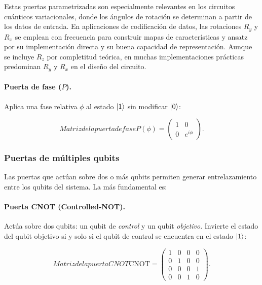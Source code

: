 Estas puertas parametrizadas son especialmente relevantes en los circuitos cuánticos variacionales, donde los ángulos de rotación se determinan a partir de los datos de entrada. En aplicaciones de codificación de datos, las rotaciones $R_y$ y $R_x$ se emplean con frecuencia para construir mapas de características y ansatz por su implementación directa y su buena capacidad de representación. Aunque se incluye $R_z$ por completitud teórica, en muchas implementaciones prácticas predominan $R_y$ y $R_x$ en el diseño del circuito.

\paragraph{Puerta de fase ($P$).} Aplica una fase relativa $\phi$ al estado $\ket{1}$ sin modificar $\ket{0}$:

\begin{equation}{Matriz de la puerta de fase}
P(\phi) = \begin{pmatrix} 1 & 0 \\ 0 & e^{i\phi} \end{pmatrix}.
\end{equation}

\subsubsection{Puertas de múltiples qubits}
\label{ap:subsubsec:puertasmultiplesqubits}

Las puertas que actúan sobre dos o más qubits permiten generar entrelazamiento entre los qubits del sistema. La más fundamental es:

\paragraph{Puerta CNOT (Controlled-NOT).} Actúa sobre dos qubits: un qubit de \textit{control} y un qubit \textit{objetivo}. Invierte el estado del qubit objetivo si y solo si el qubit de control se encuentra en el estado $\ket{1}$:

\begin{equation}{Matriz de la puerta CNOT}
\text{CNOT} = \begin{pmatrix} 1 & 0 & 0 & 0 \\ 0 & 1 & 0 & 0 \\ 0 & 0 & 0 & 1 \\ 0 & 0 & 1 & 0 \end{pmatrix}.
\end{equation}

